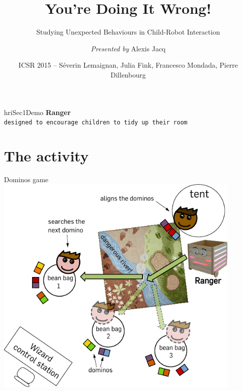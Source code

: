 \documentclass[compress]{beamer}
\title{You’re Doing It Wrong!}
\subtitle{Studying Unexpected Behaviours in Child-Robot Interaction}
\date{ICSR 2015 -- Séverin Lemaignan, Julia Fink, Francesco Mondada,
Pierre Dillenbourg}
\author{\textit{Presented by} Alexis Jacq}
\institute{Computer-Human Interaction\\for Learning and Instruction {\Medium
EPFL}}
\begin{document}
\maketitle


\begin{frame}[plain]

\begin{beamercolorbox}[wd=\linewidth,ht=6ex,dp=0.7ex]{hriSec1Demo}
    \textbf{Ranger}\\
    \scriptsize
    {\tt designed to encourage children to tidy up their room}\\
\end{beamercolorbox}
    \vfill

\end{frame}
\fullbackground{}

\section{The activity}

\begin{frame}{Dominos game}
     {
    \centering
        \includegraphics[width=0.9\textwidth]{domino-setup}
    }
\end{frame}
\end{document}

